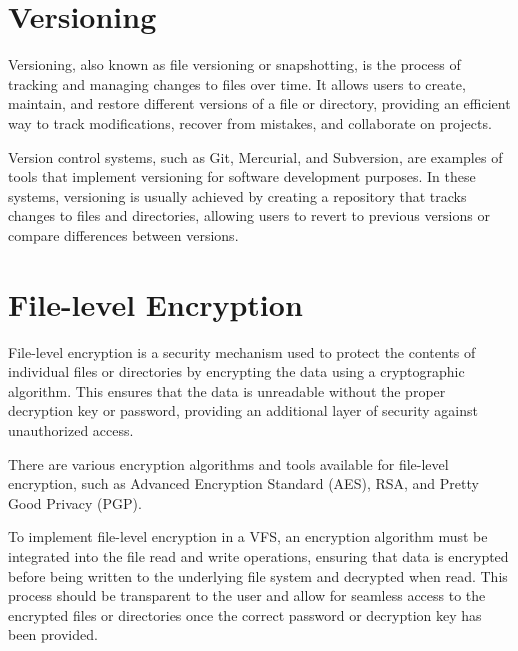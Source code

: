 \section{Versioning}

Versioning, also known as file versioning or snapshotting, is the process of tracking and managing changes to files over time.
It allows users to create, maintain, and restore different versions of a file or directory, providing an efficient way to track modifications, recover from mistakes, and collaborate on projects.

Version control systems, such as Git, Mercurial, and Subversion, are examples of tools that implement versioning for software development purposes.
In these systems, versioning is usually achieved by creating a repository that tracks changes to files and directories, allowing users to revert to previous versions or compare differences between versions.

\section{File-level Encryption}

File-level encryption is a security mechanism used to protect the contents of individual files or directories by encrypting the data using a cryptographic algorithm.
This ensures that the data is unreadable without the proper decryption key or password, providing an additional layer of security against unauthorized access.

There are various encryption algorithms and tools available for file-level encryption, such as Advanced Encryption Standard (AES), RSA, and Pretty Good Privacy (PGP).

To implement file-level encryption in a VFS, an encryption algorithm must be integrated into the file read and write operations, ensuring that data is encrypted before being written to the underlying file system and decrypted when read.
This process should be transparent to the user and allow for seamless access to the encrypted files or directories once the correct password or decryption key has been provided.
